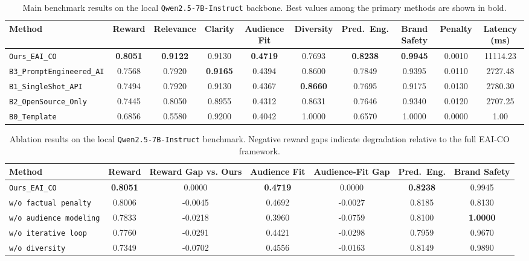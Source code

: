 \documentclass[applsci,article,submit,pdftex,moreauthors]{Definitions/mdpi}
\begin{document}
\begin{table}[t]
\centering
\caption{Main benchmark results on the local \texttt{Qwen2.5-7B-Instruct} backbone. Best values among the primary methods are shown in bold.}
\label{tab:qwen_main_results}
\begin{adjustbox}{max width=\textwidth}
\begin{tabular}{lccccccccc}
\toprule
Method & Reward & Relevance & Clarity & Audience Fit & Diversity & Pred.\ Eng. & Brand Safety & Penalty & Latency (ms) \\
\midrule
\texttt{Ours\_EAI\_CO} & \textbf{0.8051} & \textbf{0.9122} & 0.9130 & \textbf{0.4719} & 0.7693 & \textbf{0.8238} & \textbf{0.9945} & 0.0010 & 11114.23 \\
\texttt{B3\_PromptEngineered\_AI} & 0.7568 & 0.7920 & \textbf{0.9165} & 0.4394 & 0.8600 & 0.7849 & 0.9395 & 0.0110 & 2727.48 \\
\texttt{B1\_SingleShot\_API} & 0.7494 & 0.7920 & 0.9130 & 0.4367 & \textbf{0.8660} & 0.7695 & 0.9175 & 0.0130 & 2780.30 \\
\texttt{B2\_OpenSource\_Only} & 0.7445 & 0.8050 & 0.8955 & 0.4312 & 0.8631 & 0.7646 & 0.9340 & 0.0120 & 2707.25 \\
\texttt{B0\_Template} & 0.6856 & 0.5580 & 0.9200 & 0.4042 & 1.0000 & 0.6570 & 1.0000 & 0.0000 & 1.00 \\
\bottomrule
\end{tabular}
\end{adjustbox}
\end{table}

\begin{table}[t]
\centering
\caption{Ablation results on the local \texttt{Qwen2.5-7B-Instruct} benchmark. Negative reward gaps indicate degradation relative to the full EAI-CO framework.}
\label{tab:qwen_ablation}
\begin{adjustbox}{max width=\textwidth}
\begin{tabular}{lcccccc}
\toprule
Method & Reward & Reward Gap vs. Ours & Audience Fit & Audience-Fit Gap & Pred.\ Eng. & Brand Safety \\
\midrule
\texttt{Ours\_EAI\_CO} & \textbf{0.8051} & 0.0000 & \textbf{0.4719} & 0.0000 & \textbf{0.8238} & 0.9945 \\
\texttt{w/o factual penalty} & 0.8006 & -0.0045 & 0.4692 & -0.0027 & 0.8185 & 0.8130 \\
\texttt{w/o audience modeling} & 0.7833 & -0.0218 & 0.3960 & -0.0759 & 0.8100 & \textbf{1.0000} \\
\texttt{w/o iterative loop} & 0.7760 & -0.0291 & 0.4421 & -0.0298 & 0.7959 & 0.9670 \\
\texttt{w/o diversity} & 0.7349 & -0.0702 & 0.4556 & -0.0163 & 0.8149 & 0.9890 \\
\bottomrule
\end{tabular}
\end{adjustbox}
\end{table}
\end{document}
